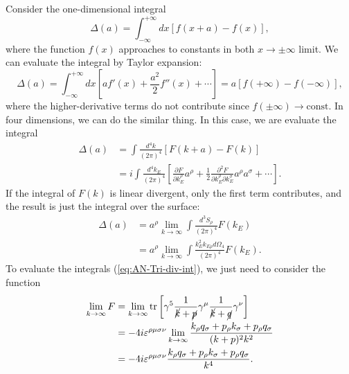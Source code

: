 Consider the one-dimensional integral
\begin{equation}
	\Delta(a) = \int^{+\infty}_{-\infty} dx \left[f(x+a)-f(x)\right],
\end{equation}
where the function $f(x)$ approaches to constants in both $x \rightarrow \pm\infty$ limit.
We can evaluate the integral by Taylor expansion:
\begin{equation}
	\Delta(a) = \int^{+\infty}_{-\infty} dx \left[af'(x)+\frac{a^2}{2}f''(x)+\cdots\right]
	= a\left[f(+\infty)-f(-\infty)\right],
\end{equation}
where the higher-derivative terms do not contribute since $f(\pm\infty)\rightarrow \text{const}$. 
In four dimensions, we can do the similar thing.
In this case, we are evaluate the integral
\begin{equation}
\begin{aligned}
	\Delta(a) 
	&= \int \frac{d^4k}{(2\pi)^4} \left[F(k+a)-F(k)\right] \\
	&= i\int \frac{d^4k_E}{(2\pi)^4} \left[\frac{\partial F}{\partial k_E^\rho} a^\rho + \frac{1}{2} \frac{\partial^2 F}{\partial k_E^\rho \partial k_E^\sigma} a^\rho a^\sigma + \cdots\right].
\end{aligned}
\end{equation}
If the integral of $F(k)$ is linear divergent, only the first term contributes, and the result is just the integral over the surface:
\begin{equation}
\begin{aligned}
	\Delta(a) &= a^\rho \lim_{k\rightarrow \infty} \int \frac{d^3 S_\rho}{(2\pi)^4} F(k_E) \\
	&= a^\rho \lim_{k\rightarrow \infty} \int \frac{k^2_E k_{E\rho} d \Omega_4}{(2\pi)^4} F(k_E).
\end{aligned}
\end{equation}
To evaluate the integrals (\ref{eq:AN-Tri-div-int}), we just need to consider the function
\begin{equation}
\begin{aligned}
	\lim_{k\rightarrow \infty} F 
	&= \lim_{k\rightarrow \infty} \operatorname{tr}\left[\gamma^{5} \frac{1}{\cancel k + \cancel p} \gamma^\mu \frac{1}{\cancel k+\cancel q}\gamma^{\nu}\right] \\
	&= -4i \varepsilon^{\rho\mu\sigma\nu} \lim_{k\rightarrow \infty} \frac{k_\rho q_\sigma + p_\rho k_\sigma + p_\rho q_\sigma}{(k+p)^2 k^2} \\
	&= -4i \varepsilon^{\rho\mu\sigma\nu} \frac{k_\rho q_\sigma + p_\rho k_\sigma + p_\rho q_\sigma}{k^4}.
\end{aligned}
\end{equation}
